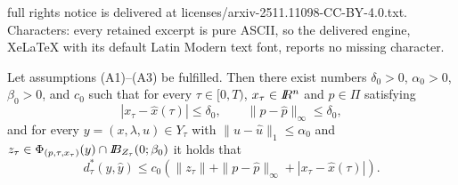 \documentclass[10pt,a4paper]{amsart}
\newcommand{\B}{I\kern -.35em B}
\newcommand{\R}{I\kern -.35em R}
\newcommand{\al}{\alpha}
\newcommand{\bd}{\begin{displaymath}}
\newcommand{\be}{\begin{equation}}
\newcommand{\ed}{\end{displaymath}}
\newcommand{\ee}{\end{equation}}
\begin{document}
full rights notice is delivered at licenses/arxiv-2511.11098-CC-BY-4.0.txt. Characters: every retained excerpt is pure ASCII, so the delivered engine, XeLaTeX with its default Latin Modern text font, reports no missing character.
\begin{prop} \label{Pmain_error}
Let assumptions (A1)--(A3) be fulfilled. Then there exist numbers $\delta_0 > 0$, $\al_0 > 0$, $\beta_0 >0$,  
and $c_0$ such that for every $\tau \in [0,T)$, $x_\tau \in \R^n$ and $p \in \varPi$ satisfying
\be \label{Edelta0}
            | x_\tau - \hat x(\tau)| \leq \delta_0, \qquad \|p - \hat p \|_\infty \leq \delta_0,
\ee
and for every $y = (x, \lambda, u) \in Y_\tau$ with $\| u - \hat u \|_1 \leq \al_0$ and 
$z_\tau \in \Phi_{(p,\tau,x_\tau)}(y) \cap \B_{Z_\tau}(0;\beta_0)$ it holds that 
\bd
                  d_\tau^*(y,\hat y) \leq c_0 \left( \| z_\tau \| + \| p - \hat p \|_\infty + | x_\tau - \hat x(\tau) | \right).
\ed
\end{prop}
\end{document}
